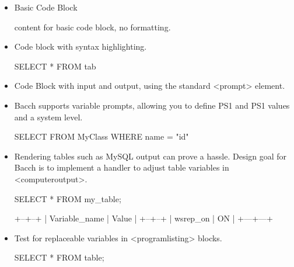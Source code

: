 \documentclass[openright,pdflatex,10pt]{book}
\begin{document}
\begin{itemize}
\item

Basic Code Block


      \begin{code}
content for basic code block, no formatting.
\end{code}

\item

Code block with syntax highlighting.


      \begin{code}
SELECT * FROM tab
\end{code}

\item

Code Block with input and output, using the standard <prompt> element.



\item

Bacch supports variable prompts, allowing you to define PS1 and PS1 values and a system level.


      \begin{code}
SELECT FROM MyClass
WHERE name = "id"
\end{code}

\item

Rendering tables such as MySQL output can prove a hassle.  Design goal for Bacch is to implement a handler to adjust table variables in <computeroutput>.


      \begin{code}
SELECT * FROM my_table;

+--+--+
| Variable_name | Value |
+--+--+
| wsrep_on | ON |
+---+---+
\end{code}

\item

Test for replaceable variables in <programlisting> blocks.


      \begin{code}
SELECT * FROM table;
\end{code}


\end{itemize}
\end{document}
